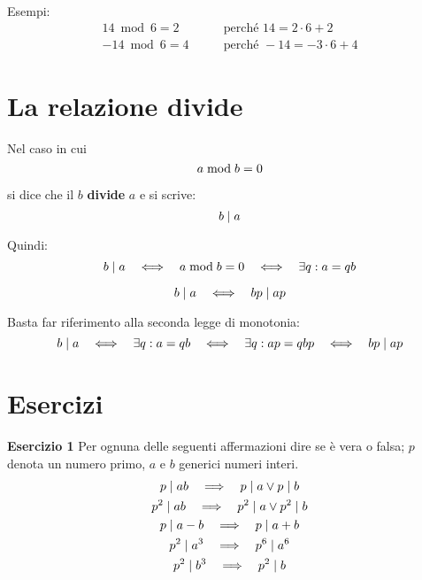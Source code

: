 Esempi:
\begin{align*}
    14 \bmod 6 = 2 &\quad\quad\text{perché } 14 = 2\cdot 6 + 2 \\
    -14 \bmod 6 = 4 &\quad\quad\text{perché } -14 = -3 \cdot 6 + 4
\end{align*}

\section{La relazione divide}
\label{sec:divide}

\begin{definizione}[Divide]
    Nel caso in cui
    \begin{equation*}
        a  \bmod  b = 0
    \end{equation*}
    
    si dice che il $b$ \textbf{divide} $a$ e si scrive:
    \begin{equation*}
        b  \mid  a
    \end{equation*}

    Quindi:
    \begin{equation*}
        b  \mid  a  \quad\Longleftrightarrow\quad  a  \bmod  b = 0  \quad\Longleftrightarrow\quad  \exists q : a = qb
    \end{equation*}
    
\end{definizione}

\begin{teorema}
    \begin{equation*}
        b  \mid  a  \quad\Longleftrightarrow\quad  bp  \mid  ap
    \end{equation*}


    Basta far riferimento alla seconda legge di monotonia:
    \begin{equation*}
        b  \mid  a  \quad\Longleftrightarrow\quad  \exists q : a = qb  \quad\Longleftrightarrow\quad  \exists q : ap = qbp  \quad\Longleftrightarrow\quad  bp  \mid  ap
    \end{equation*}
\end{teorema}

\section{Esercizi}
\label{sec:esercizi_divisione}

\textbf{Esercizio 1}
Per ognuna delle seguenti affermazioni dire se è vera o falsa;
$p$ denota un numero primo, $a$ e $b$ generici numeri interi.
\begin{gather*}
    p  \mid  ab  \quad\Longrightarrow\quad  p  \mid  a \lor p  \mid  b \\
    p^2  \mid  ab  \quad\Longrightarrow\quad  p^2  \mid  a \lor p^2  \mid  b \\
    p  \mid  a-b  \quad\Longrightarrow\quad  p  \mid  a+b \\
    p^2  \mid  a^3  \quad\Longrightarrow\quad  p^6  \mid  a^6 \\
    p^2  \mid  b^3  \quad\Longrightarrow\quad  p^2  \mid  b
\end{gather*}